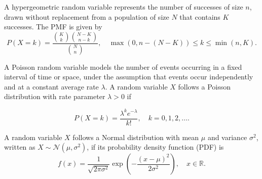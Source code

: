 \documentclass[../main.tex]{subfiles}
\begin{document}
\begin{definition}
A hypergeometric random variable represents the number of successes of size $n$, drawn without replacement from a population of size \( N \) that contains \( K \) successes. The PMF is given by
\[
P(X = k) = \frac{\binom{K}{k} \binom{N - K}{n - k}}{\binom{N}{n}}, \quad \max(0, n - (N - K)) \leq k \leq \min(n, K).
\]

\end{definition}

\begin{definition}
A Poisson random variable models the number of events occurring in a fixed interval of time or space, under the assumption that events occur independently and at a constant average rate \( \lambda \).
A random variable \( X \) follows a Poisson distribution with rate parameter \( \lambda > 0 \) if

\[
P(X = k) = \frac{\lambda^k e^{-\lambda}}{k!}, \quad k = 0, 1, 2, \dots.
\]


\end{definition}


\begin{definition}
A random variable \( X \) follows a Normal distribution with mean \( \mu \) and variance \( \sigma^2 \), written as \( X \sim \mathcal{N}(\mu, \sigma^2) \), if its probability density function (PDF) is
\[
f(x) = \frac{1}{\sqrt{2\pi\sigma^2}} \exp \left( -\frac{(x - \mu)^2}{2\sigma^2} \right), \quad x \in \mathbb{R}.
\]
\end{definition}
\end{document}
